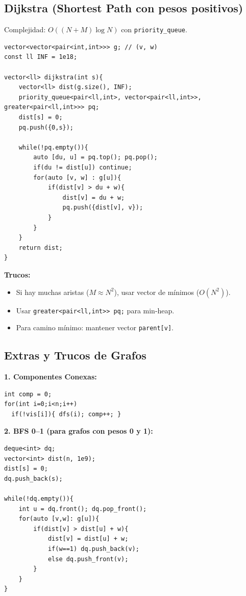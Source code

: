 \documentclass{article}
\begin{document}
\subsection{Dijkstra (Shortest Path con pesos positivos)}

Complejidad: \(O((N + M) \log N)\) con \lstinline|priority_queue|.

\begin{lstlisting}[style=cppstyle]
vector<vector<pair<int,int>>> g; // (v, w)
const ll INF = 1e18;

vector<ll> dijkstra(int s){
    vector<ll> dist(g.size(), INF);
    priority_queue<pair<ll,int>, vector<pair<ll,int>>, greater<pair<ll,int>>> pq;
    dist[s] = 0;
    pq.push({0,s});

    while(!pq.empty()){
        auto [du, u] = pq.top(); pq.pop();
        if(du != dist[u]) continue;
        for(auto [v, w] : g[u]){
            if(dist[v] > du + w){
                dist[v] = du + w;
                pq.push({dist[v], v});
            }
        }
    }
    return dist;
}
\end{lstlisting}

\textbf{Trucos:}
\begin{itemize}
  \item Si hay muchas aristas (\(M \approx N^2\)), usar vector de mínimos (\(O(N^2)\)).
  \item Usar \lstinline|greater<pair<ll,int>> pq;| para min-heap.
  \item Para camino mínimo: mantener vector \lstinline|parent[v]|.
\end{itemize}


\subsection{Extras y Trucos de Grafos}

\textbf{1. Componentes Conexas:}
\begin{lstlisting}[style=cppstyle]
int comp = 0;
for(int i=0;i<n;i++)
  if(!vis[i]){ dfs(i); comp++; }
\end{lstlisting}

\textbf{2. BFS 0–1 (para grafos con pesos 0 y 1):}
\begin{lstlisting}[style=cppstyle]
deque<int> dq;
vector<int> dist(n, 1e9);
dist[s] = 0;
dq.push_back(s);

while(!dq.empty()){
    int u = dq.front(); dq.pop_front();
    for(auto [v,w]: g[u]){
        if(dist[v] > dist[u] + w){
            dist[v] = dist[u] + w;
            if(w==1) dq.push_back(v);
            else dq.push_front(v);
        }
    }
}
\end{lstlisting}
\end{document}
